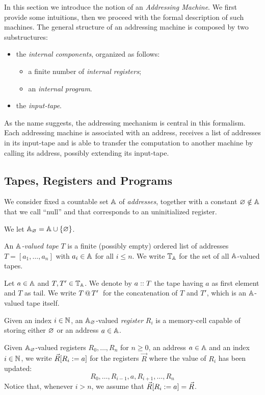 
In this section we introduce the notion of an \emph{Addressing Machine}.
We first provide some intuitions, then we proceed with the formal description of such machines.
The general structure of an addressing machine is composed by two substructures:
\begin{itemize}
\item the \emph{internal components}, organized as follows:
	\begin{itemize}
	\item a finite number of \emph{internal registers};
	\item an \emph{internal program}.
\end{itemize}
\item the \emph{input-tape}.
\end{itemize}
As the name suggests, the addressing mechanism is central in this formalism.
Each addressing machine is associated with an address, receives a list of addresses in its input-tape and is able to transfer the computation to another machine by calling its address, possibly extending its input-tape.

\subsection{Tapes, Registers and Programs}
We consider fixed a countable set $\mathbb{A}$ of \emph{addresses}, together with a constant $\varnothing\notin\mathbb{A}$ that we call ``null'' and that corresponds to an uninitialized register.
\begin{defi} We let $\mathbb{A}_\varnothing = \mathbb{A}\cup\{\varnothing\}$.
\bsub
\item
	An \emph{$\mathbb{A}$-valued tape} $T$ is a finite (possibly empty) ordered list of addresses $T = [a_1,\dots,a_n]$ with $a_i\in\mathbb{A}$ for all $i \le n$.
	We write $\mathbb{T}_{\mathbb{A}}$ for the set of all $\mathbb{A}$-valued tapes.
\item
	 Let $a\in\mathbb{A}$ and $T,T'\in\mathbb{T}_{\mathbb{A}}$. We denote by $a::T$ the tape having $a$ as first element and $T$ as tail. We write $T\,@\,T'\,$ for the concatenation of $T$ and $T'$, which is an $\mathbb{A}$-valued tape itself.

\item
	Given an index $i\in\mathbb{N}$, an $\mathbb{A}_\varnothing$-valued \emph{register} $R_i$ is a memory-cell capable of storing either $\varnothing$ or an address $a\in\mathbb{A}$.
 \item Given $\mathbb{A}_\varnothing$-valued registers $R_0,\dots,R_{n}$ for $n\ge 0$, an address $a\in\mathbb{A}$ and an index $i\in\mathbb{N}$, we write $\vec R[R_i:=a]$ for the registers $\vec R$ where the value of $R_i$ has been updated:
 \[
 R_0,\dots,R_{i-1},a,R_{i+1},\dots,R_{n}
 \]
Notice that, whenever $i > n$, we assume that $\vec R[R_i:=a] = \vec R$.
\esub
\end{defi}

